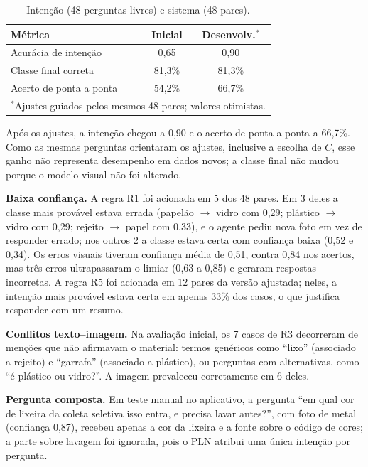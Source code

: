 \documentclass[conference]{IEEEtran}
\begin{document}
\begin{table}[t]
\centering
\caption{Inten\c{c}\~ao (48 perguntas livres) e sistema (48 pares).}
\label{tab:sis}
\begin{tabular}{lcc}
\toprule
M\'etrica & Inicial & Desenvolv.$^{*}$\\
\midrule
Acur\'acia de inten\c{c}\~ao & 0,65 & 0,90\\
Classe final correta & 81,3\% & 81,3\%\\
Acerto de ponta a ponta & 54,2\% & 66,7\%\\
\bottomrule
\multicolumn{3}{l}{\footnotesize $^{*}$Ajustes guiados pelos mesmos 48 pares; valores otimistas.}
\end{tabular}
\end{table}

Ap\'os os ajustes, a inten\c{c}\~ao chegou a 0{,}90 e o acerto de ponta a ponta a 66{,}7\%. Como as mesmas perguntas orientaram os ajustes, inclusive a escolha de $C$, esse ganho n\~ao representa desempenho em dados novos; a classe final n\~ao mudou porque o modelo visual n\~ao foi alterado.

\textbf{Baixa confian\c{c}a.} A regra R1 foi acionada em 5 dos 48 pares. Em 3 deles a classe mais prov\'avel estava errada (papel\~ao $\rightarrow$ vidro com 0{,}29; pl\'astico $\rightarrow$ vidro com 0{,}29; rejeito $\rightarrow$ papel com 0{,}33), e o agente pediu nova foto em vez de responder errado; nos outros 2 a classe estava certa com confian\c{c}a baixa (0{,}52 e 0{,}34). Os erros visuais tiveram confian\c{c}a m\'edia de 0{,}51, contra 0{,}84 nos acertos, mas tr\^es erros ultrapassaram o limiar (0{,}63 a 0{,}85) e geraram respostas incorretas. A regra R5 foi acionada em 12 pares da vers\~ao ajustada; neles, a inten\c{c}\~ao mais prov\'avel estava certa em apenas 33\% dos casos, o que justifica responder com um resumo.

\textbf{Conflitos texto--imagem.} Na avalia\c{c}\~ao inicial, os 7 casos de R3 decorreram de men\c{c}\~oes que n\~ao afirmavam o material: termos gen\'ericos como ``lixo'' (associado a rejeito) e ``garrafa'' (associado a pl\'astico), ou perguntas com alternativas, como ``\'e pl\'astico ou vidro?''. A imagem prevaleceu corretamente em 6 deles.

\textbf{Pergunta composta.} Em teste manual no aplicativo, a pergunta ``em qual cor de lixeira da coleta seletiva isso entra, e precisa lavar antes?'', com foto de metal (confian\c{c}a 0{,}87), recebeu apenas a cor da lixeira e a fonte sobre o c\'odigo de cores; a parte sobre lavagem foi ignorada, pois o PLN atribui uma \'unica inten\c{c}\~ao por pergunta.
\end{document}
